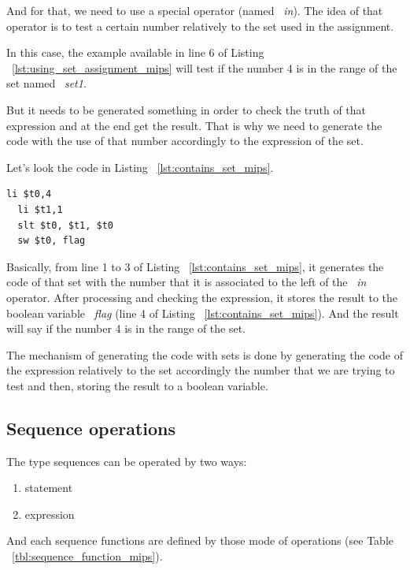 \documentclass[
  oneside,
  11pt, a4paper,
  footinclude=true,
  headinclude=true,
  cleardoublepage=empty
]{scrbook}
\begin{document}
And for that, we need to use a special operator (named ~\textit{in}).
The idea of that operator is to test a certain number relatively to the set used in the assignment.

In this case, the example available in line 6 of Listing ~\ref{lst:using_set_assignment_mips} will test if the number 4 is in the range of the set named ~\textit{set1}.

But it needs to be generated something in order to check the truth of that expression and at the end get the result. That is why we need to generate the code with the use of that number accordingly to the expression of the set.

Let's look the code in Listing ~\ref{lst:contains_set_mips}.

\begin{lstlisting}[caption={Code generated for line 6 of Listing ~\ref{lst:using_set_assignment_mips}},label={lst:contains_set_mips}]
  li $t0,4		
  li $t1,1		
  slt $t0, $t1, $t0	
  sw $t0, flag		
\end{lstlisting}

Basically, from line 1 to 3 of Listing ~\ref{lst:contains_set_mips}, it generates the code of that set with the number that it is associated to the left of the ~\textit{in} operator. After processing and checking the expression, it stores the result to the boolean variable ~\textit{flag} (line 4 of Listing ~\ref{lst:contains_set_mips}). And the result will say if the number 4 is in the range of the set.

The mechanism of generating the code with sets is done by generating the code of the expression relatively to the set accordingly the number that we are trying to test and then, storing the result to a boolean variable.

\subsection{Sequence operations}

The type sequences can be operated by two ways: 

\begin{enumerate}
\item statement
\item expression
\end{enumerate}

And each sequence functions are defined by those mode of operations (see Table ~\ref{tbl:sequence_function_mips}).
\end{document}
